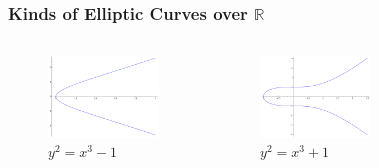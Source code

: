 \documentclass[xcolor=pdftex,dvipsnames,table]{beamer}
\theoremstyle{plain}
\theoremstyle{definition}
\def\RR{\mathbb{R}}
\begin{document}
\begin{frame}
	\frametitle{Kinds of Elliptic Curves over $\RR$}
	\begin{columns}
	\begin{figure}
		\centering
		\includegraphics[scale=0.1]{c1.png}
		\caption{$y^2=x^3-1$}
	\end{figure}
	\begin{figure}
		\centering
		\includegraphics[scale=0.1]{c2.png}
		\caption{$y^2=x^3+1$}
	\end{figure}
	\begin{figure}
		\centering

\end{figure}
\end{columns}
\end{frame}
\end{document}
